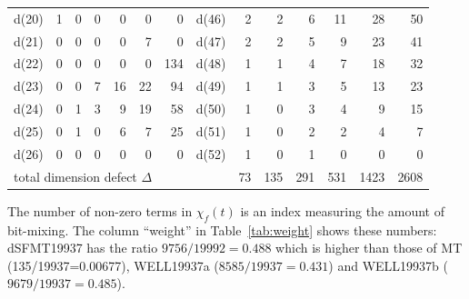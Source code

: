 \documentclass{svmult}
\begin{document}
\begin{table}
\begin{center}
\begin{tabular}{|r|rrrrrr||r|rrrrrr|}
      d(20) & 1 & 0 & 0 & 0 & 0 & 0 & d(46) & 2 & 2 & 6 & 11 & 28 & 50 \\
      d(21) & 0 & 0 & 0 & 0 & 7 & 0 & d(47) & 2 & 2 & 5 & 9 & 23 & 41 \\
      d(22) & 0 & 0 & 0 & 0 & 0 & 134 & d(48) & 1 & 1 & 4 & 7 & 18 & 32 \\
      d(23) & 0 & 0 & 7 & 16 & 22 & 94 & d(49) & 1 & 1 & 3 & 5 & 13 & 23 \\
      d(24) & 0 & 1 & 3 & 9 & 19 & 58 & d(50) & 1 & 0 & 3 & 4 & 9 & 15 \\
      d(25) & 0 & 1 & 0 & 6 & 7 & 25 & d(51) & 1 & 0 & 2 & 2 & 4 & 7 \\
      d(26) & 0 & 0 & 0 & 0 & 0 & 0 & d(52) & 1 & 0 & 1 & 0 & 0 & 0 \\ \hline
      \multicolumn{8}{|l|}{total dimension defect $\Delta$}
      & 73 & 135 & 291 & 531 & 1423 & 2608 \\ \hline
    \end{tabular}
  \end{center}
\end{table}

\begin{remark}
  The number of non-zero terms in $\chi_f(t)$ is an index measuring
  the amount of bit-mixing.  The column ``weight'' in
  Table~\ref{tab:weight} shows these numbers:
  dSFMT19937 has the ratio $9756/19992=0.488$ which is higher than those of MT
  (135/19937=0.00677), WELL19937a ($8585/19937=0.431$) and
  WELL19937b ($9679/19937=0.485$).
\end{remark}
\end{document}
